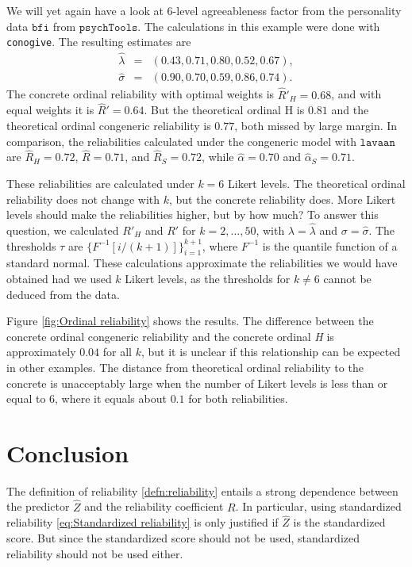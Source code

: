 \documentclass[twoside]{article}
\begin{document}
\begin{example}
We will yet again have a look at $6$-level agreeableness factor from the
personality data $\mathtt{bfi}$ from $\mathtt{psychTools}$. The calculations in this example were done with \texttt{conogive}. 
The resulting estimates are 
\begin{eqnarray*}
\hat{\lambda} & = & (0.43,0.71,0.80,0.52,0.67),\\
\hat{\sigma} & = & (0.90,0.70,0.59,0.86,0.74).
\end{eqnarray*} The concrete ordinal reliability
with optimal weights is $\hat{R}'_{H}=0.68$, and with equal weights
it is $\hat{R}'=0.64$. But the theoretical ordinal H is $0.81$ 
and the theoretical ordinal congeneric reliability is $0.77$, both missed by large margin. In comparison, the
reliabilities calculated under the congeneric model with $\mathtt{lavaan}$ \citep{Rosseel2012-yg}
are $\hat{R}_{H}=0.72$, $\hat{R}=0.71$, and $\hat{R}_S = 0.72$, while $\hat{\alpha} = 0.70$ and $\hat{\alpha}_S = 0.71$.

These reliabilities are calculated under $k=6$ Likert levels. The theoretical ordinal reliability does not change with $k$, but the concrete reliability does. More Likert levels should make the reliabilities higher, but by how much? To answer this question, we calculated $R'_{H}$ and $R'$ for $k = 2,\ldots,50$, with  $\lambda = \hat{\lambda} $ and $ \sigma = \hat{\sigma}$. The thresholds $\tau$ are $\{F^{-1}[i/(k+1)]\}_{i=1}^{k+1}$, where $F^{-1}$ is the quantile function of a standard normal. These calculations approximate the reliabilities we would have obtained had we used $k$ Likert levels, as the thresholds for $k \neq 6$ cannot be deduced from the data.

Figure \ref{fig:Ordinal reliability} shows the results. The difference between the concrete ordinal congeneric reliability and the concrete ordinal \textit{H} is approximately $0.04$ for all $k$, but it is unclear if this relationship can be expected in other examples. The distance from theoretical ordinal reliability to the concrete is unacceptably large when the number of Likert levels is less than or equal to $6$, where it equals about $0.1$ for both reliabilities. 
\end{example}

\section{Conclusion}
The definition of reliability \eqref{defn:reliability} entails a strong dependence between the predictor $\hat{Z}$ and the reliability coefficient $ R$. In particular, using standardized reliability \eqref{eq:Standardized reliability} is only justified if $\hat{Z}$ is the standardized score. But since the standardized score should not be used, standardized reliability should not be used either.
\end{document}
